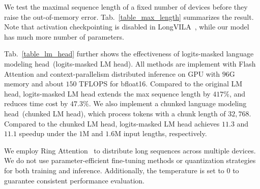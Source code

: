 %
We test the maximal sequence length of a fixed number of devices before they raise the out-of-memory error.
%
Tab.~\ref{table_max_length} summarizes the result.
%
Note that activation checkpointing is disabled in LongVILA~\cite{LongVILA}, while our model has much more number of parameters.
%



%
Tab.~\ref{table_lm_head} further shows the effectiveness of logits-masked language modeling head~(logits-masked LM head).
%
All methods are implement with Flash Attention and context-parallelism distributed inference on GPU with $96$G memory and about $150$ TFLOPS for bfloat16.
%
Compared to the original LM head, logits-masked LM head extends the max sequence length by $417\%$, and reduces time cost by $47.3\%$.
%
We also implement a chunked language modeling head~(chunked LM head), which process tokens with a chunk length of $32,768$.
%
Compared to the chunked LM head, logits-masked LM head achieves $11.3$ and $11.1$ speedup under the $1$M  and $1.6$M input lengths, respectively.
%



%
We employ Ring Attention~\cite{RingAttention} to distribute long sequences across multiple devices.
%
We do not use parameter-efficient fine-tuning methods or quantization strategies for both training and inference.
%
Additionally, the temperature is set to $0$ to guarantee consistent performance evaluation.
%
%

